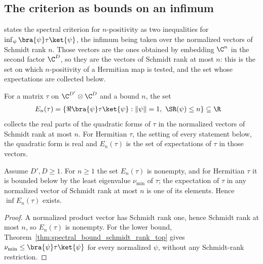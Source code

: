 \subsection{The criterion as bounds on an infimum}

\cite[Chapter~3, Proposition~3.2]{Wolf2012Quantum} states the spectral
criterion for $n$-positivity as two inequalities for
$\inf_\psi\bra{\psi}\tau\ket{\psi}$, the infimum being taken over the
normalized vectors of Schmidt rank $n$. Those vectors are the ones obtained by
embedding $\C^n$ in the second factor $\C^{D}$, so they are the vectors of
Schmidt rank at most $n$: this is the set on which $n$-positivity of a
Hermitian map is tested, and the set whose expectations are collected below.

\begin{definition}
    \label{def:schmidt_rank_le_expectations}
    \leanok
    For a matrix $\tau$ on $\C^{D'}\otimes\C^{D}$ and a bound $n$, the set
    \begin{align}
        E_n(\tau)
         & =\{\Re\bra{\psi}\tau\ket{\psi}:\|\psi\|=1,\ \SR(\psi)\le n\}
        \subseteq\R
        \label{eq:channel_schmidt_rank_le_expectations}
    \end{align}
    collects the real parts of the quadratic forms of $\tau$ in the normalized
    vectors of Schmidt rank at most $n$. For Hermitian $\tau$, the setting of
    every statement below, the quadratic form is real and $E_n(\tau)$ is the
    set of expectations of $\tau$ in those vectors.
\end{definition}

\begin{lemma}
    \label{lem:schmidt_rank_le_expectations_inf_exists}
    \leanok
    Assume $D',D\ge1$. For $n\ge1$ the set $E_n(\tau)$ is nonempty, and for
    Hermitian $\tau$ it is bounded below by the least eigenvalue $\nu_{\min}$ of
    $\tau$; the expectation of $\tau$ in any normalized vector of Schmidt rank at
    most $n$ is one of its elements. Hence $\inf E_n(\tau)$ exists.
\end{lemma}

\begin{proof}
    \leanok
    A normalized product vector has Schmidt rank one, hence Schmidt rank at
    most $n$, so $E_n(\tau)$ is nonempty. For the lower bound,
    Theorem~\ref{thm:spectral_bound_schmidt_rank_top} gives
    $\nu_{\min}\le\bra{\psi}\tau\ket{\psi}$ for every normalized $\psi$,
    without any Schmidt-rank restriction.
\end{proof}

